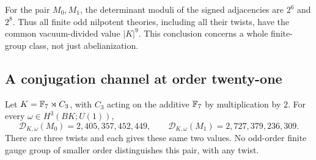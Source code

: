 For the pair \(M_0,M_1\), the determinant moduli of the signed
adjacencies are \(2^6\) and \(2^8\). Thus all finite odd
nilpotent theories, including all their twists, have the
common vacuum-divided value \(|K|^9\). This conclusion concerns
a whole finite-group class, not just abelianization.

\subsection{A conjugation channel at order twenty-one}

\begin{theorem}\label{thm:sep}
Let \(K=\mathbb F_7\rtimes C_3\), with \(C_3\) acting on the additive
\(\mathbb F_7\) by multiplication by \(2\). For every
\(\omega\in H^3(BK;U(1))\),
\[
 \mathcal D_{K,\omega}(M_0)=2{,}405{,}357{,}452{,}449,\qquad
 \mathcal D_{K,\omega}(M_1)=2{,}727{,}379{,}236{,}309 .
\]
There are three twists and each gives these same two values.
No odd-order finite gauge group of smaller order distinguishes
this pair, with any twist.
\end{theorem}
